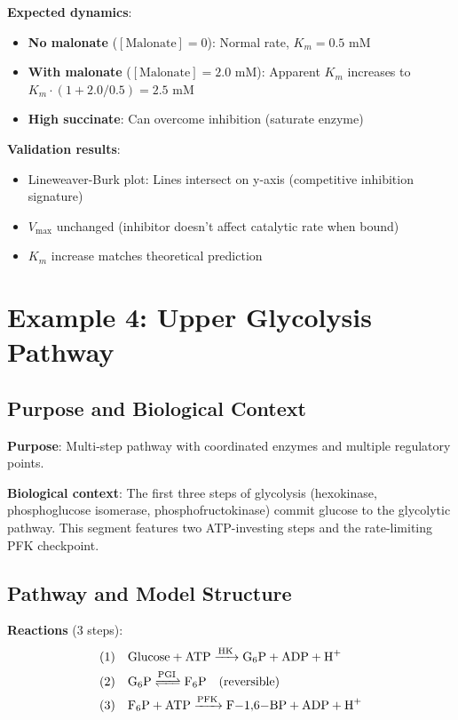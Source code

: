 \textbf{Expected dynamics}:

\begin{itemize}
    \item \textbf{No malonate} ($[\text{Malonate}] = 0$): Normal rate, $K_m = 0.5$ mM
    \item \textbf{With malonate} ($[\text{Malonate}] = 2.0$ mM): Apparent $K_m$ increases to $K_m \cdot (1 + 2.0/0.5) = 2.5$ mM
    \item \textbf{High succinate}: Can overcome inhibition (saturate enzyme)
\end{itemize}

\textbf{Validation results}:

\begin{itemize}
    \item Lineweaver-Burk plot: Lines intersect on y-axis (competitive inhibition signature)
    \item $V_{\max}$ unchanged (inhibitor doesn't affect catalytic rate when bound)
    \item $K_m$ increase matches theoretical prediction
\end{itemize}

\section{Example 4: Upper Glycolysis Pathway}
\label{sec:example-upper-glycolysis}

\subsection{Purpose and Biological Context}
\label{subsec:gly-purpose}

\textbf{Purpose}: Multi-step pathway with coordinated enzymes and multiple regulatory points.

\textbf{Biological context}: The first three steps of glycolysis (hexokinase, phosphoglucose isomerase, phosphofructokinase) commit glucose to the glycolytic pathway. This segment features two ATP-investing steps and the rate-limiting PFK checkpoint.

\subsection{Pathway and Model Structure}
\label{subsec:gly-structure}

\textbf{Reactions} (3 steps):
\begin{align}
\text{(1)} \quad &\ce{Glucose + ATP ->[HK] G6P + ADP + H+} \\
\text{(2)} \quad &\ce{G6P <=>[PGI] F6P} \quad \text{(reversible)} \\
\text{(3)} \quad &\ce{F6P + ATP ->[PFK] F-1,6-BP + ADP + H+}
\end{align}


